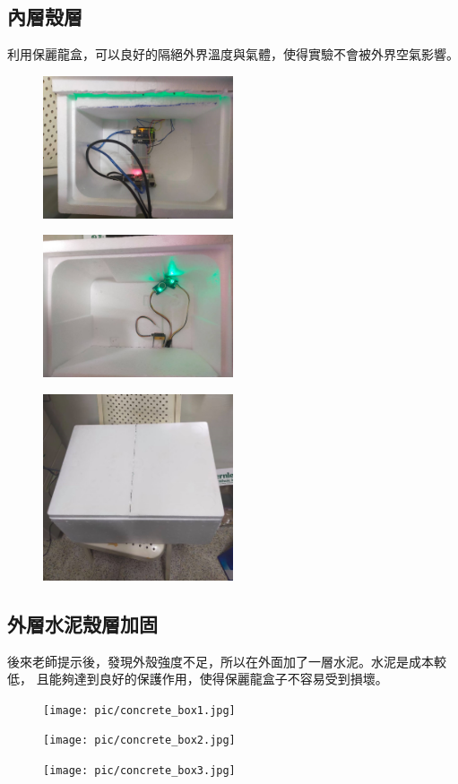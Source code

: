 	\subsection{內層殼層}
		利用保麗龍盒，可以良好的隔絕外界溫度與氣體，使得實驗不會被外界空氣影響。
		\begin{figure}[H]
			\centering
			\includegraphics[width=0.5\textwidth]{pic/box(1).jpg}
		\end{figure}
		\begin{figure}[H]
			\centering
			\includegraphics[width=0.5\textwidth]{pic/box(2).jpg}
		\end{figure}
		\begin{figure}[H]
			\centering
			\includegraphics[width=0.5\textwidth]{pic/box(3).jpg}
		\end{figure}
	\subsection{外層水泥殼層加固}
		後來老師提示後，發現外殼強度不足，所以在外面加了一層水泥。水泥是成本較低，
		且能夠達到良好的保護作用，使得保麗龍盒子不容易受到損壞。
		\begin{figure}[H]
			\centering
			\texttt{[image: pic/concrete\_box1.jpg]}
		\end{figure}
		\begin{figure}[H]
			\centering
			\texttt{[image: pic/concrete\_box2.jpg]}
		\end{figure}
		\begin{figure}[H]
			\centering
			\texttt{[image: pic/concrete\_box3.jpg]}
		\end{figure}

